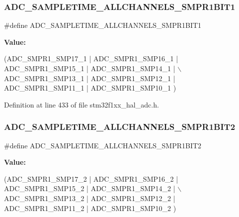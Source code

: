 \subsubsection{\texorpdfstring{A\+D\+C\+\_\+\+S\+A\+M\+P\+L\+E\+T\+I\+M\+E\+\_\+\+A\+L\+L\+C\+H\+A\+N\+N\+E\+L\+S\+\_\+\+S\+M\+P\+R1\+B\+I\+T1}{ADC\_SAMPLETIME\_ALLCHANNELS\_SMPR1BIT1}}
{\footnotesize\ttfamily \#define A\+D\+C\+\_\+\+S\+A\+M\+P\+L\+E\+T\+I\+M\+E\+\_\+\+A\+L\+L\+C\+H\+A\+N\+N\+E\+L\+S\+\_\+\+S\+M\+P\+R1\+B\+I\+T1}

{\bfseries Value\+:}
\begin{DoxyCode}
(ADC\_SMPR1\_SMP17\_1 | ADC\_SMPR1\_SMP16\_1 | ADC\_SMPR1\_SMP15\_1 | ADC\_SMPR1\_SMP14\_1 | \(\backslash\)
      ADC\_SMPR1\_SMP13\_1 | ADC\_SMPR1\_SMP12\_1 | ADC\_SMPR1\_SMP11\_1 | ADC\_SMPR1\_SMP10\_1 )
\end{DoxyCode}


Definition at line 433 of file stm32f1xx\+\_\+hal\+\_\+adc.\+h.

\mbox{\label{group___a_d_c__sampling__times__all__channels_gaa49cebaf9c1607e518b5aa80843f0363}} 
\subsubsection{\texorpdfstring{A\+D\+C\+\_\+\+S\+A\+M\+P\+L\+E\+T\+I\+M\+E\+\_\+\+A\+L\+L\+C\+H\+A\+N\+N\+E\+L\+S\+\_\+\+S\+M\+P\+R1\+B\+I\+T2}{ADC\_SAMPLETIME\_ALLCHANNELS\_SMPR1BIT2}}
{\footnotesize\ttfamily \#define A\+D\+C\+\_\+\+S\+A\+M\+P\+L\+E\+T\+I\+M\+E\+\_\+\+A\+L\+L\+C\+H\+A\+N\+N\+E\+L\+S\+\_\+\+S\+M\+P\+R1\+B\+I\+T2}

{\bfseries Value\+:}
\begin{DoxyCode}
(ADC\_SMPR1\_SMP17\_2 | ADC\_SMPR1\_SMP16\_2 | ADC\_SMPR1\_SMP15\_2 | ADC\_SMPR1\_SMP14\_2 | \(\backslash\)
      ADC\_SMPR1\_SMP13\_2 | ADC\_SMPR1\_SMP12\_2 | ADC\_SMPR1\_SMP11\_2 | ADC\_SMPR1\_SMP10\_2 )
\end{DoxyCode}


